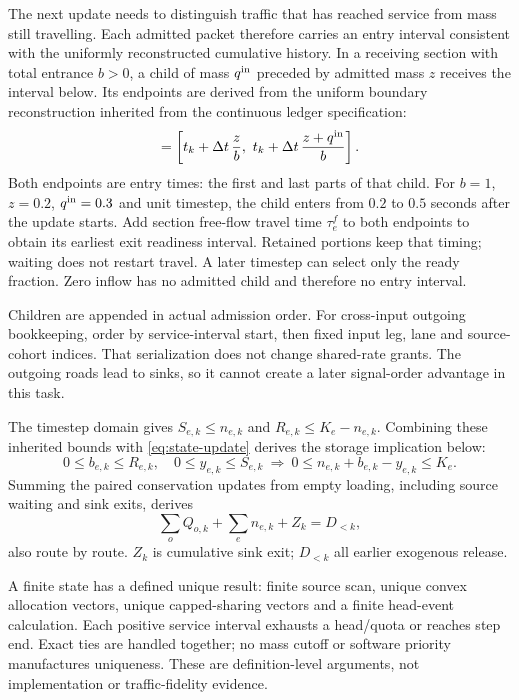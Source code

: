 \documentclass[10pt,a4paper]{article}
\newcommand{\rev}[1]{{\color{revisionred}#1}}
\begin{document}
The next update needs to distinguish traffic that has reached service
from mass still travelling. Each admitted packet therefore carries an
entry interval consistent with the uniformly reconstructed cumulative
history. In a receiving section with total entrance $b>0$, a child of
mass $q^{\rm in}$ preceded by admitted mass $z$ receives the interval below.
\rev{Its endpoints are derived from the uniform boundary reconstruction inherited from the continuous ledger specification:}
\begin{equation}
 [t^{\rm in}_{\rm front},t^{\rm in}_{\rm tail}]
 =\left[t_k+\Delta t\,\frac z b,\
       t_k+\Delta t\,\frac{z+q^{\rm in}}b\right].
 \label{eq:entry-time}
\end{equation}
Both endpoints are entry times: the first and last parts of that child.
For $b=1$, $z=0.2$, $q^{\rm in}=0.3$ and unit timestep, the child enters
from $0.2$ to $0.5$ seconds after the update starts. Add section free-flow
travel time $\tau^f_e$ to both endpoints to obtain its earliest exit
readiness interval. Retained portions keep that timing; waiting does not
restart travel. A later timestep can select only the ready fraction.
Zero inflow has no admitted child and therefore no entry interval.

Children are appended in actual admission order. For cross-input
outgoing bookkeeping, order by service-interval start, then fixed input
leg, lane and source-cohort indices. That serialization does not change
shared-rate grants. The outgoing roads lead to sinks, so it cannot create
a later signal-order advantage in this task.
\par

The timestep domain gives $S_{e,k}\leq n_{e,k}$ and
$R_{e,k}\leq K_e-n_{e,k}$.
\rev{Combining these inherited bounds with \eqref{eq:state-update} derives the storage implication below:}
\begin{equation}
 0\leq b_{e,k}\leq R_{e,k},\quad0\leq y_{e,k}\leq S_{e,k}
 \ \Longrightarrow\
 0\leq n_{e,k}+b_{e,k}-y_{e,k}\leq K_e .
 \label{eq:storage-bound}
\end{equation}
\rev{Summing the paired conservation updates from empty loading, including source waiting and sink exits, derives}
\begin{equation}
 \sum_oQ_{o,k}+\sum_en_{e,k}+Z_k=D_{<k},
 \label{eq:mass-identity}
\end{equation}
also route by route. $Z_k$ is cumulative sink exit; $D_{<k}$ all earlier
exogenous release.

A finite state has a defined unique result: finite source scan, unique
convex allocation vectors, unique capped-sharing vectors and a finite
head-event calculation. Each positive service interval exhausts a
head/quota or reaches step end. Exact ties are handled together; no
mass cutoff or software priority manufactures uniqueness. These are
definition-level arguments, not implementation or traffic-fidelity evidence.
\end{document}
